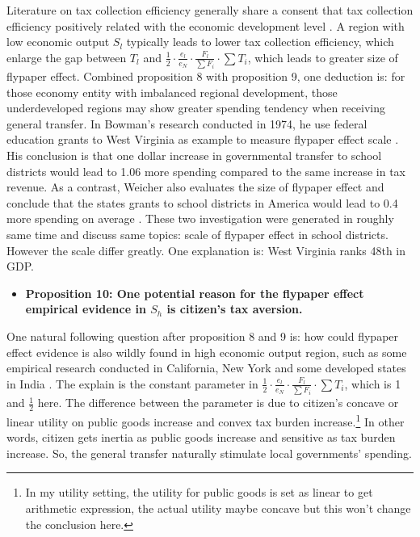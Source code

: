 Literature on tax collection efficiency generally share a consent that tax collection efficiency positively related with the economic development level \parencite{arvate2008efficiency,mattos2011flypaper}. A region with low economic output $S_l$ typically leads to lower tax collection efficiency, which enlarge the gap between $T_l$ and $\frac{1}{2}\cdot \frac{e_l}{e_N}\cdot \frac{F_l}{\sum F_i} \cdot \sum T_i$, which leads to greater size of flypaper effect. Combined proposition 8 with proposition 9, one deduction is: for those economy entity with imbalanced regional development, those underdeveloped regions may show greater spending tendency when receiving general transfer. In Bowman's research conducted in 1974, he use federal education grants to West Virginia as example to measure flypaper effect scale \parencite{bowman1974tax}. His conclusion is that one dollar increase in governmental transfer to school districts would lead to 1.06 more spending compared to the same increase in tax revenue. As a contrast, Weicher also evaluates the size of flypaper effect and conclude that the states grants to school districts in America would lead to 0.4 more spending on average \parencite{weicher1972aid}. These two investigation were generated in roughly same time and discuss same topics: scale of flypaper effect in school districts. However the scale differ greatly. One explanation is: West Virginia ranks 48th in GDP.

\begin{itemize}
    \item \textbf{Proposition 10: One potential reason for the flypaper effect empirical evidence in $S_h$ is citizen's tax aversion.}
\end{itemize}

One natural following question after proposition 8 and 9 is: how could flypaper effect evidence is also wildly found in high economic output region, such as some empirical research conducted in California, New York and some developed states in India \parencite{nguyen2020flypaper,bae2004flypaper,lalvani2002flypaper}. The explain is the constant parameter in $\frac{1}{2}\cdot \frac{e_l}{e_N}\cdot \frac{F_l}{\sum F_i} \cdot \sum T_i$, which is 1 and $\frac{1}{2}$ here. The difference between the parameter is due to citizen's concave or linear utility on public goods increase and convex tax burden increase.\footnote{In my utility setting, the utility for public goods is set as linear to get arithmetic expression, the actual utility maybe concave but this won't change the conclusion here.} In other words, citizen gets inertia as public goods increase and sensitive as tax burden increase. So, the general transfer naturally stimulate local governments' spending.

